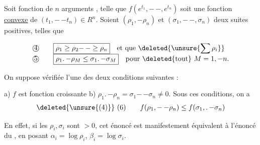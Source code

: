   Soit  fonction   de $n$ arguments  , telle que $f(e^{t_1},\mathord{-}\,\mathord{-},e^{t_n})$ soit une fonction \uline{convexe} de $(t_1,\mathord{-}\,\mathord{-}t_n)\in R^n$. Soient $(\rho_1,\mathord{-}\rho_n)$ et $(\sigma_1,\mathord{-}\,\mathord{-},\sigma_n)$ deux suites  positives, telles que 

{\reversemarginpar{}}
\[
\begin{array}{@{}l@{\qquad}l@{}}
\text{\textcircled{4}}&\displaystyle\boxed{\rho_1\geq\rho_2\mathord{-}\,\mathord{-}\geq\rho_n}\quad\text{et que }\deleted{\unsure{\sum\rho_i}}\\
\text{\textcircled{5}}&\displaystyle\boxed{\rho_1\mathord{.}\,\mathord{-}\rho_M\leq\sigma_1\mathord{.}\,\mathord{-}\sigma_M}\quad\text{pour }\deleted{\text{tout}}\ M=1,\mathord{-}n.
\end{array}
\]

On suppose vérifiée l'une des deux conditions suivantes :

{\reversemarginpar{}}

a) $f$ est  fonction croissante    b) $\rho_1\mathord{.}\,\mathord{-}\rho_n=\sigma_1\mathord{-}\,\mathord{-}\sigma_n\ne0$. Sous ces conditions, on a
\[
\begin{array}{@{}l@{\qquad}l@{}}
\deleted{\unsure{(4)}}\ (6)&\displaystyle f(\rho_1,\mathord{-}\,\mathord{-}\rho_n)\leq f(\sigma_1,\mathord{.}\,\mathord{-}\sigma_n)
\end{array}
\]

En effet, si les $\rho_i,\sigma_i$ sont $>0$, cet énoncé est manifestement équivalent à l'énoncé du , en posant $\alpha_i=\log\rho_i$, $\beta_i=\log\sigma_i$. 

